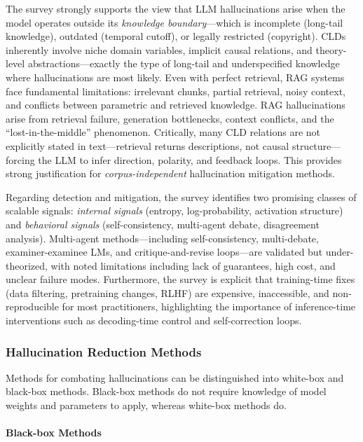 \documentclass[12pt]{article}
\begin{document}
The survey strongly supports the view that LLM hallucinations arise when the model operates outside its \textit{knowledge boundary}---which is incomplete (long-tail knowledge), outdated (temporal cutoff), or legally restricted (copyright). CLDs inherently involve niche domain variables, implicit causal relations, and theory-level abstractions---exactly the type of long-tail and underspecified knowledge where hallucinations are most likely. Even with perfect retrieval, RAG systems face fundamental limitations: irrelevant chunks, partial retrieval, noisy context, and conflicts between parametric and retrieved knowledge. RAG hallucinations arise from retrieval failure, generation bottlenecks, context conflicts, and the ``lost-in-the-middle'' phenomenon. Critically, many CLD relations are not explicitly stated in text---retrieval returns descriptions, not causal structure---forcing the LLM to infer direction, polarity, and feedback loops. This provides strong justification for \textit{corpus-independent} hallucination mitigation methods.

Regarding detection and mitigation, the survey identifies two promising classes of scalable signals: \textit{internal signals} (entropy, log-probability, activation structure) and \textit{behavioral signals} (self-consistency, multi-agent debate, disagreement analysis). Multi-agent methods---including self-consistency, multi-debate, examiner-examinee LMs, and critique-and-revise loops---are validated but under-theorized, with noted limitations including lack of guarantees, high cost, and unclear failure modes. Furthermore, the survey is explicit that training-time fixes (data filtering, pretraining changes, RLHF) are expensive, inaccessible, and non-reproducible for most practitioners, highlighting the importance of inference-time interventions such as decoding-time control and self-correction loops.

\subsubsection{Hallucination Reduction Methods}

Methods for combating hallucinations can be distinguished into white-box and black-box methods. Black-box methods do not require knowledge of model weights and parameters to apply, whereas white-box methods do.

\paragraph{Black-box Methods}
\end{document}
